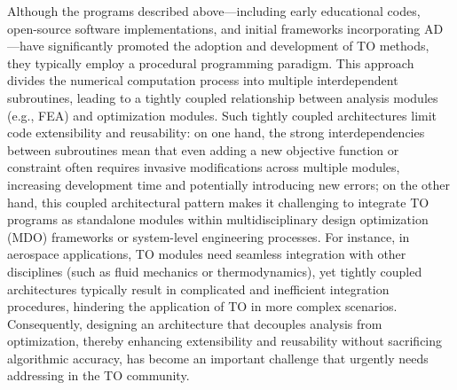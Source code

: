 \documentclass[mathpazo]{cicp}
\begin{document}
Although the programs described above—including early educational codes, open-source software implementations, and initial frameworks incorporating AD—have significantly promoted the adoption and development of TO methods, they typically employ a procedural programming paradigm. This approach divides the numerical computation process into multiple interdependent subroutines, leading to a tightly coupled relationship between analysis modules (e.g., FEA) and optimization modules. Such tightly coupled architectures limit code extensibility and reusability: on one hand, the strong interdependencies between subroutines mean that even adding a new objective function or constraint often requires invasive modifications across multiple modules, increasing development time and potentially introducing new errors; on the other hand, this coupled architectural pattern makes it challenging to integrate TO programs as standalone modules within multidisciplinary design optimization (MDO) frameworks or system-level engineering processes. For instance, in aerospace applications, TO modules need seamless integration with other disciplines (such as fluid mechanics or thermodynamics), yet tightly coupled architectures typically result in complicated and inefficient integration procedures, hindering the application of TO in more complex scenarios. Consequently, designing an architecture that decouples analysis from optimization, thereby enhancing extensibility and reusability without sacrificing algorithmic accuracy, has become an important challenge that urgently needs addressing in the TO community.
\end{document}
